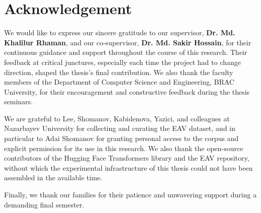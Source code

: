 \section*{Acknowledgement}

We would like to express our sincere gratitude to our supervisor, \textbf{Dr. Md. Khalilur Rhaman}, and our co-supervisor, \textbf{Dr. Md. Sakir Hossain}, for their continuous guidance and support throughout the course of this research. Their feedback at critical junctures, especially each time the project had to change direction, shaped the thesis's final contribution. We also thank the faculty members of the Department of Computer Science and Engineering, BRAC University, for their encouragement and constructive feedback during the thesis seminars.

We are grateful to Lee, Shomanov, Kabidenova, Yazici, and colleagues at Nazarbayev University for collecting and curating the EAV dataset, and in particular to Adai Shomanov for granting personal access to the corpus and explicit permission for its use in this research. We also thank the open-source contributors of the Hugging Face Transformers library and the EAV repository, without which the experimental infrastructure of this thesis could not have been assembled in the available time.

Finally, we thank our families for their patience and unwavering support during a demanding final semester.

\pagebreak
